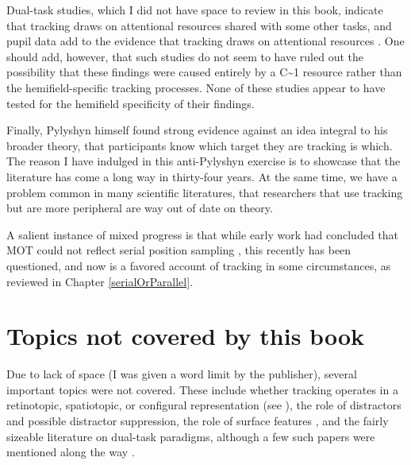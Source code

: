 \documentclass[
]{book}
\begin{document}
Dual-task studies, which I did not have space to review in this book, indicate that tracking draws on attentional resources shared with some other tasks, and pupil data add to the evidence that tracking draws on attentional resources \citep{oksamaPositionTrackingIdentity2016, alnaesPupilSizeSignals2014}. One should add, however, that such studies do not seem to have ruled out the possibility that these findings were caused entirely by a C\textasciitilde1 resource rather than the hemifield-specific tracking processes. None of these studies appear to have tested for the hemifield specificity of their findings.

Finally, Pylyshyn himself found strong evidence against an idea integral to his broader theory, that participants know which target they are tracking is which. The reason I have indulged in this anti-Pylyshyn exercise is to showcase that the literature has come a long way in thirty-four years. At the same time, we have a problem common in many scientific literatures, that researchers that use tracking but are more peripheral are way out of date on theory.

A salient instance of mixed progress is that while early work had concluded that MOT could not reflect serial position sampling \citep{pylyshynTrackingMultipleIndependent1988, yantisMultielementVisualTracking1992}, this recently has been questioned, and now is a favored account of tracking in some circumstances, as reviewed in Chapter \ref{serialOrParallel}.

\hypertarget{topics-not-covered-by-this-book}{%
\section{Topics not covered by this book}\label{topics-not-covered-by-this-book}}

Due to lack of space (I was given a word limit by the publisher), several important topics were not covered. These include whether tracking operates in a retinotopic, spatiotopic, or configural representation (see \citep{yantisMultielementVisualTracking1992, billHierarchicalStructureEmployed2020, howeCoordinateSystemsUsed2010, meyerhoffDistractorLocationsInfluence2015b, liuMultipleObjectTrackingBased2005, maechlerAttentionalTrackingTakes2021}), the role of distractors and possible distractor suppression, the role of surface features \citep{papenmeierTrackingLocationFeatures2014}, and the fairly sizeable literature on dual-task paradigms, although a few such papers were mentioned along the way \citep[e.g.,][]{alvarezMultielementVisualTracking2005}.
\end{document}

